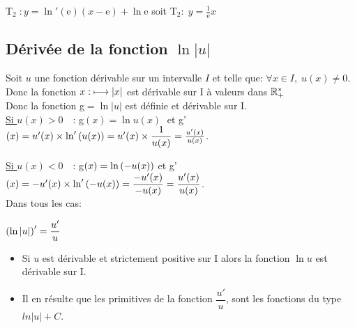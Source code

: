   T$ _{2} \;: y= \ln'(\mathrm{e})(x-\mathrm{e}) +\ln \mathrm{e}$ \; soit \; T$ _{2}:\;y=\tfrac{1}{\mathrm{e}}x $ 
  \begin{center}
\end{center}

\subsection*{Dérivée de la fonction $ \ln|u| $}
Soit   $ u $ une fonction dérivable sur un intervalle $I$  et  telle que:  $ \forall x \in I ,\; u(x)\neq 0 $.\\
Donc la fonction  $ x :\;\longmapsto \left\lvert x \right\rvert $ est dérivable sur I à valeurs dans $ \mathbb{R}_+^* $\\
Donc la fonction  g$=\ln|u|  $  est définie et dérivable  sur I.\\
\underline{Si $u(x)> 0 \quad$}: g$ (x)=\ln u( x)\; $ et\; g'$ (x)= u'(x) \times \ln'\left(u(x)\right)= u'(x)\times \dfrac{1}{u(x)} =\frac{u'(x)}{u(x)} $.

\underline{Si $u(x)< 0 \quad $}: g$ (x)=\ln\left(-u(x)\right) $\; et\; g'$(x)=- u'(x) \times \ln'\left(-u(x)\right) =\dfrac{-u'(x)}{-u(x)}= \dfrac{u'(x)}{u(x)}$.\\
Dans tous les cas: \quad


 $  \left(\ln|u|\right)^{\prime}= \dfrac{u'}{u}$ 



\begin{corollary}
\begin{itemize}
\item
 Si $u$ est dérivable et strictement positive sur I alors la fonction $ \ln u $ est dérivable sur I.
 \item Il en résulte que les primitives de la fonction $\dfrac{u'}{u}$,
sont les fonctions du type $ln |u| + C$.
\end{itemize}
\end{corollary}

